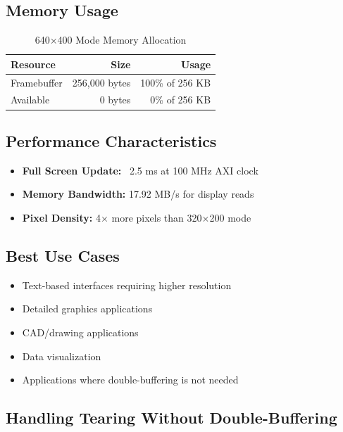 \documentclass[11pt,letterpaper]{report}
\begin{document}
\subsection{Memory Usage}

\begin{table}[tbp]
\centering
\caption{640$\times$400 Mode Memory Allocation}
\label{tab:mem_640}
\begin{tabular}{lrr}
\toprule
\textbf{Resource} & \textbf{Size} & \textbf{Usage} \\
\midrule
Framebuffer & 256,000 bytes & 100\% of 256 KB \\
Available & 0 bytes & 0\% of 256 KB \\
\bottomrule
\end{tabular}
\end{table}

\subsection{Performance Characteristics}

\begin{itemize}
    \item \textbf{Full Screen Update:} ~2.5 ms at 100 MHz AXI clock
    \item \textbf{Memory Bandwidth:} 17.92 MB/s for display reads
    \item \textbf{Pixel Density:} 4$\times$ more pixels than 320$\times$200 mode
\end{itemize}

\subsection{Best Use Cases}

\begin{itemize}
    \item Text-based interfaces requiring higher resolution
    \item Detailed graphics applications
    \item CAD/drawing applications
    \item Data visualization
    \item Applications where double-buffering is not needed
\end{itemize}

\subsection{Handling Tearing Without Double-Buffering}
\end{document}
